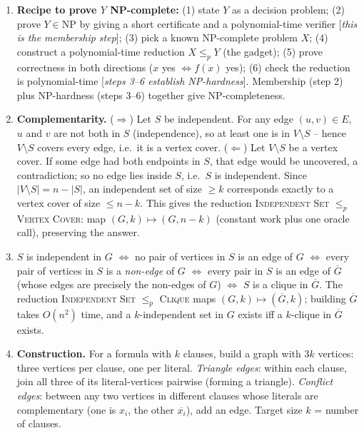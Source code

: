 \documentclass[11pt]{article}
\begin{document}
\begin{enumerate}[label=\textbf{A\arabic*.}, leftmargin=2.2em]
\item \textbf{Recipe to prove $Y$ NP-complete:} (1) state $Y$ as a decision problem; (2)
prove $Y \in \mathrm{NP}$ by giving a short certificate and a polynomial-time verifier
[\emph{this is the membership step}]; (3) pick a known NP-complete problem $X$; (4)
construct a polynomial-time reduction $X \le_p Y$ (the gadget); (5) prove correctness in
both directions ($x$ yes $\iff f(x)$ yes); (6) check the reduction is polynomial-time
[\emph{steps 3--6 establish NP-hardness}]. Membership (step 2) plus NP-hardness (steps 3--6)
together give NP-completeness.

\item \textbf{Complementarity.} ($\Rightarrow$) Let $S$ be independent. For any edge
$(u,v) \in E$, $u$ and $v$ are not both in $S$ (independence), so at least one is in $V
\setminus S$ -- hence $V \setminus S$ covers every edge, i.e.\ it is a vertex cover.
($\Leftarrow$) Let $V \setminus S$ be a vertex cover. If some edge had both endpoints in
$S$, that edge would be uncovered, a contradiction; so no edge lies inside $S$, i.e.\ $S$
is independent. Since $|V \setminus S| = n - |S|$, an independent set of size $\ge k$
corresponds exactly to a vertex cover of size $\le n - k$. This gives the reduction
\textsc{Independent Set} $\le_p$ \textsc{Vertex Cover}: map $(G, k) \mapsto (G, n - k)$
(constant work plus one oracle call), preserving the answer.

\item $S$ is independent in $G$ $\iff$ no pair of vertices in $S$ is an edge of $G$ $\iff$
every pair of vertices in $S$ is a \emph{non-edge} of $G$ $\iff$ every pair in $S$ is an
edge of $\overline{G}$ (whose edges are precisely the non-edges of $G$) $\iff$ $S$ is a
clique in $\overline{G}$. The reduction \textsc{Independent Set} $\le_p$ \textsc{Clique}
maps $(G, k) \mapsto (\overline{G}, k)$; building $\overline{G}$ takes $O(n^2)$ time, and a
$k$-independent set in $G$ exists iff a $k$-clique in $\overline{G}$ exists.

\item \textbf{Construction.} For a formula with $k$ clauses, build a graph with $3k$
vertices: three vertices per clause, one per literal. \emph{Triangle edges}: within each
clause, join all three of its literal-vertices pairwise (forming a triangle). \emph{Conflict
edges}: between any two vertices in different clauses whose literals are complementary (one
is $x_i$, the other $\overline{x_i}$), add an edge. Target size $k$ = number of clauses.


\end{enumerate}
\end{document}
